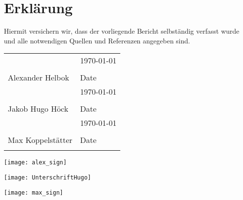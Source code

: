 \section*{Erklärung}

Hiermit versichern wir, dass der vorliegende Bericht selbständig verfasst wurde und alle notwendigen Quellen und Referenzen angegeben sind.

\begin{tabular}{@{}p{2.5in}p{2.5in}@{}}
	\\[5\bigskipamount]
	& \hspace{2mm}\today \\[-12pt]
	\dotfill & \dotfill \\
	Alexander Helbok & Date \\[5\bigskipamount]
	& \hspace{2mm}\today \\[-12pt]
	\dotfill & \dotfill \\
	Jakob Hugo Höck & Date \\
	[5\bigskipamount]
	& \hspace{2mm}\today \\[-12pt]
	\dotfill & \dotfill \\
	Max Koppelstätter & Date \\
	\centering
\end{tabular}

\begin{minipage}{0.3\textwidth}
	\vspace{-20.5cm}
	\texttt{[image: alex\_sign]}
\end{minipage}

\begin{minipage}{0.3\textwidth}
	\vspace{-13.4cm}
	\texttt{[image: UnterschriftHugo]}
\end{minipage}

\begin{minipage}{0.3\textwidth}
	\vspace{-7.4cm}
	\texttt{[image: max\_sign]}
\end{minipage}